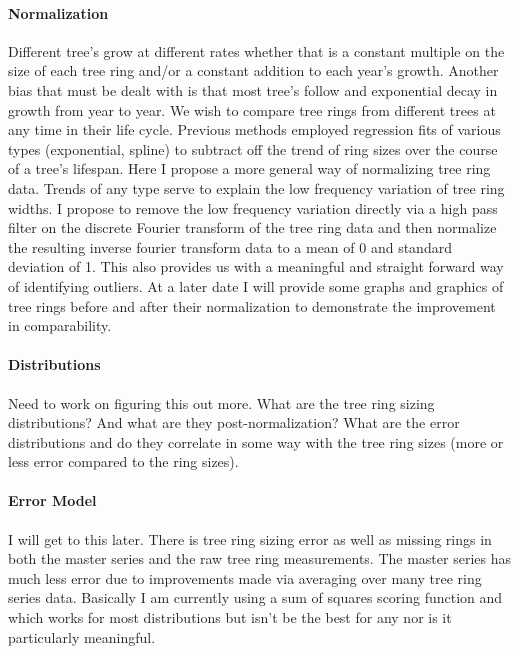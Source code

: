 \documentclass[11pt]{article}
\begin{document}
\paragraph{Normalization\newline}
\par{
Different tree's grow at different rates whether that is a constant multiple on the size of each tree ring and/or a constant addition to each year's growth. Another bias that must be dealt with is that most tree's follow and exponential decay in growth from year to year. We wish to compare tree rings from different trees at any time in their life cycle. Previous methods employed regression fits of various types (exponential, spline) to subtract off the trend of ring sizes over the course of a tree's lifespan. Here I propose a more general way of normalizing tree ring data. Trends of any type serve to explain the low frequency variation of tree ring widths. I propose to remove the low frequency variation directly via a high pass filter on the discrete Fourier transform of the tree ring data and then normalize the resulting inverse fourier transform data to a mean of 0 and standard deviation of 1. This also provides us with a meaningful and straight forward way of identifying outliers. At a later date I will provide some graphs and graphics of tree rings before and after their normalization to demonstrate the improvement in comparability.
}
\paragraph{Distributions\newline}
\par{
Need to work on figuring this out more. What are the tree ring sizing distributions? And what are they post-normalization? What are the error distributions and do they correlate in some way with the tree ring sizes (more or less error compared to the ring sizes).
}
\paragraph{Error Model\newline}
\par{
I will get to this later. There is tree ring sizing error as well as missing rings in both the master series and the raw tree ring measurements.  The master series has much less error due to improvements made via averaging over many tree ring series data. Basically I am currently using a sum of squares scoring function and  which works for most distributions but isn't be the best for any nor is it particularly meaningful.
}
\end{document}
